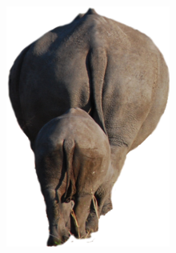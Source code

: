 \documentclass[10pt,landscape]{article}
\begin{document}
\begin{multicols}{3}


\begin{center}
 \includegraphics[width=.2\textwidth]{pics/earth-observation_org_WegmannBevanda_rhino_family.png}
\end{center}



\end{multicols}
\end{document}
